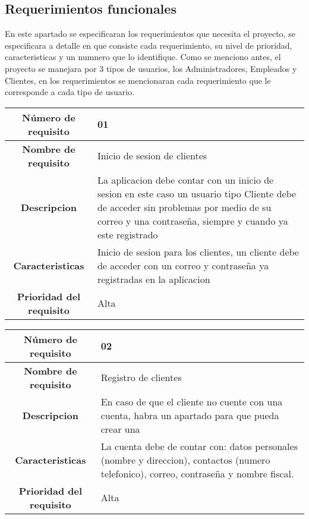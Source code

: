 \documentclass[12pt,a4paper, twosite]{article}
\begin{document}
\subsection{Requerimientos funcionales}
En este apartado se especificaran los requerimientos que necesita el proyecto, se especificara a detalle en que consiste cada requerimiento, su nivel de prioridad, caracteristicas y un numnero que lo identifique. Como se menciono antes, el proyecto se manejara por 3 tipos de usuarios, los Administradores, Empleados y Clientes, en los requerimientos se mencionaran cada requerimiento que le corresponde a cada tipo de usuario.


\begin{center}
    \begin{tabular}{|c|p{6cm}|}
        \hline
        \textbf{Número de requisito} & 01 \\
        \hline
        \textbf{Nombre de requisito} & Inicio de sesion de clientes \\
        \hline
        \textbf{Descripcion} & La aplicacion debe  contar con un inicio de sesion en este caso un usuario tipo Cliente debe de acceder sin problemas por medio de su correo y una contraseña, siempre y cuando ya este registrado  \\
        \hline
        \textbf{Caracteristicas} & Inicio de sesion para los clientes, un cliente debe de acceder con un correo y contraseña  ya registradas en la aplicacion \\
        \hline
        \textbf{Prioridad del requisito} & Alta \\
        \hline
     \end{tabular}
\end{center}

\begin{center}
    \begin{tabular}{|c|p{6cm}|}
        \hline
        \textbf{Número de requisito} & 02 \\
        \hline
        \textbf{Nombre de requisito} & Registro de clientes \\
        \hline
        \textbf{Descripcion} & En caso de que el cliente no cuente con una cuenta, habra un apartado para que pueda crear una \\
        \hline
        \textbf{Caracteristicas} & La cuenta debe de contar con: datos personales (nombre y direccion), contactos (numero telefonico), correo, contraseña y nombre fiscal.\\
        \hline
        \textbf{Prioridad del requisito} & Alta \\
        \hline
     \end{tabular}
\end{center}
\end{document}
